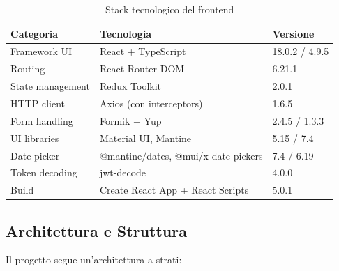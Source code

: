 \documentclass[12pt, a4paper]{article}
\begin{document}
    \begin{table}[H]
        \centering
        \small
        \begin{tabular}{lll}
            \toprule
            \textbf{Categoria} & \textbf{Tecnologia} & \textbf{Versione} \\
            \midrule
            Framework UI & React + TypeScript & 18.0.2 / 4.9.5 \\
            Routing & React Router DOM & 6.21.1 \\
            State management & Redux Toolkit & 2.0.1 \\
            HTTP client & Axios (con interceptors) & 1.6.5 \\
            Form handling & Formik + Yup & 2.4.5 / 1.3.3 \\
            UI libraries & Material UI, Mantine & 5.15 / 7.4 \\
            Date picker & @mantine/dates, @mui/x-date-pickers & 7.4 / 6.19 \\
            Token decoding & jwt-decode & 4.0.0 \\
            Build & Create React App + React Scripts & 5.0.1 \\
            \bottomrule
        \end{tabular}
        \caption{Stack tecnologico del frontend}
        \label{tab:frontend_stack}
    \end{table}

    \subsection{Architettura e Struttura}

    Il progetto segue un'architettura a strati:
\end{document}
